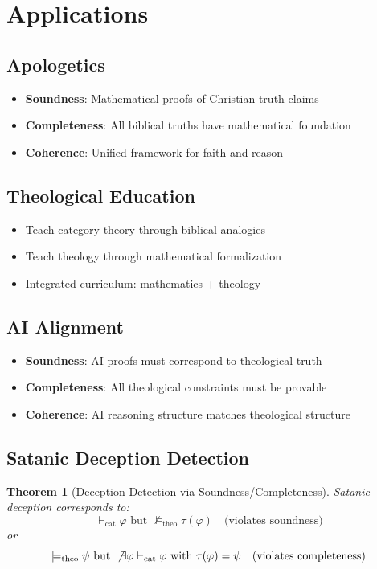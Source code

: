 \documentclass{article}
\newtheorem{theorem}{Theorem}
\begin{document}
\section{Applications}

\subsection{Apologetics}
\begin{itemize}
    \item \textbf{Soundness}: Mathematical proofs of Christian truth claims
    \item \textbf{Completeness}: All biblical truths have mathematical foundation
    \item \textbf{Coherence}: Unified framework for faith and reason
\end{itemize}

\subsection{Theological Education}
\begin{itemize}
    \item Teach category theory through biblical analogies
    \item Teach theology through mathematical formalization
    \item Integrated curriculum: mathematics + theology
\end{itemize}

\subsection{AI Alignment}
\begin{itemize}
    \item \textbf{Soundness}: AI proofs must correspond to theological truth
    \item \textbf{Completeness}: All theological constraints must be provable
    \item \textbf{Coherence}: AI reasoning structure matches theological structure
\end{itemize}

\subsection{Satanic Deception Detection}
\begin{theorem}[Deception Detection via Soundness/Completeness]
Satanic deception corresponds to:
\[
\vdash_{\text{cat}} \varphi \text{ but } \not\models_{\text{theo}} \tau(\varphi) \quad \text{(violates soundness)}
\]
or
\[
\models_{\text{theo}} \psi \text{ but } \not\exists \varphi \vdash_{\text{cat}} \varphi \text{ with } \tau(\varphi) = \psi \quad \text{(violates completeness)}
\]
\end{theorem}
\end{document}
